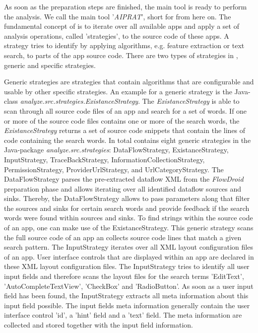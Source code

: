 As soon as the preparation steps are finished, the main \sca tool is ready to perform the \ipr analysis.
We call the main \sca tool '\textit{AIPRAT}', short for \aiprat from here on.
The fundamental concept of \AIPRAT is to iterate over all available apps and apply a set of analysis operations, called 'strategies', to the source code of these apps.
A strategy tries to identify \iprfs by applying algorithms, e.g. feature extraction or text search, to parts of the app source code.
There are two types of strategies in \AIPRAT, generic and specific strategies.

Generic strategies are strategies that contain algorithms that are configurable and usable by other specific strategies.
An example for a generic strategy is the Java-class \textit{analyze.src.strategies.ExistanceStrategy}. 
The \textit{ExistanceStrategy} is able to scan through all source code files of an app and search for a set of words.
If one or more of the source code files contains one or more of the search words, the \textit{ExistanceStrategy} returns a set of source code snippets that contain the lines of code containing the search words.
In total \AIPRAT contains eight generic strategies in the Java-package \textit{analyze.src.strategies}: DataFlowStrategy, ExistanceStrategy, InputStrategy, TraceBackStrategy, InformationCollectionStrategy, PermissionStrategy, ProviderUrlStrategy, and UrlCategoryStrategy.
The DataFlowStrategy parses the pre-extracted dataflow \acs{XML} from the \textit{FlowDroid} preparation phase and allows iterating over all identified dataflow sources and sinks.
Thereby, the DataFlowStrategy allows to pass parameters along that filter the sources and sinks for certain search words and provide feedback if the search words were found within sources and sinks.
To find strings within the source code of an app, one can make use of the ExistanceStrategy. 
This generic strategy scans the full source code of an app an collects source code lines that match a given search pattern.
The InputStrategy iterates over all \acs{XML} layout configuration files of an app. 
User interface controls that are displayed within an app are declared in these \acs{XML} layout configuration files.
The InputStrategy tries to identify all user input fields and therefore scans the layout files for the search terms 'EditText', 'AutoCompleteTextView', 'CheckBox' and 'RadioButton'.
As soon as a user input field has been found, the InputStrategy extracts all meta information about this input field possible.
The input fields meta information generally contain the user interface control 'id', a 'hint' field and a 'text' field. 
The meta information are collected and stored together with the input field information.


